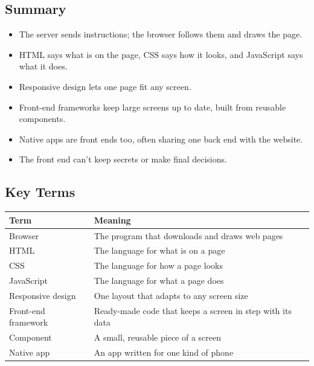 \label{webapp-02:summary-key-terms-and-review-questions}

\subsection*{Summary}\label{webapp-02:summary}

\begin{itemize}
\tightlist
\item
  The server sends instructions; the browser follows them and draws the page.
\item
  HTML says what is on the page, CSS says how it looks, and JavaScript says what it does.
\item
  Responsive design lets one page fit any screen.
\item
  Front-end frameworks keep large screens up to date, built from reusable components.
\item
  Native apps are front ends too, often sharing one back end with the website.
\item
  The front end can't keep secrets or make final decisions.
\end{itemize}


\subsection*{Key Terms}\label{webapp-02:key-terms}

{\def\LTcaptype{none} %
\begin{longtable}[]{@{}
  >{\raggedright\arraybackslash}p{}
  >{\raggedright\arraybackslash}p{}@{}}
\toprule\noalign{}
\begin{minipage}[b]{\linewidth}\raggedright
Term
\end{minipage} & \begin{minipage}[b]{\linewidth}\raggedright
Meaning
\end{minipage} \\
\midrule\noalign{}
\endhead
\bottomrule\noalign{}
\endlastfoot
Browser & The program that downloads and draws web pages \\
HTML & The language for what is on a page \\
CSS & The language for how a page looks \\
JavaScript & The language for what a page does \\
Responsive design & One layout that adapts to any screen size \\
Front-end framework & Ready-made code that keeps a screen in step with its data \\
Component & A small, reusable piece of a screen \\
Native app & An app written for one kind of phone \\
\end{longtable}
}

